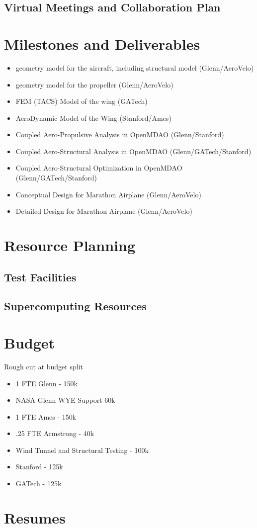 \documentclass[]{aiaa-tc}
\begin{document}
    \subsection{Virtual Meetings and Collaboration Plan}

\section{Milestones and Deliverables}

    \begin{itemize}
        \item geometry model for the aircraft, including structural model (Glenn/AeroVelo)
        \item geometry model for the propeller (Glenn/AeroVelo)
        \item FEM (TACS) Model of the wing (GATech)
        \item AeroDynamic Model of the Wing (Stanford/Ames)
        \item Coupled Aero-Propulsive Analysis in OpenMDAO (Glenn/Stanford)
        \item Coupled Aero-Structural Analysis in OpenMDAO (Glenn/GATech/Stanford)
        \item Coupled Aero-Structural Optimization in OpenMDAO (Glenn/GATech/Stanford)
        \item Conceptual Design for Marathon Airplane (Glenn/AeroVelo)
        \item Detailed Design for Marathon Airplane (Glenn/AeroVelo)
    \end{itemize}

  \section{Resource Planning}
    \subsection{Test Facilities}
    \subsection{Supercomputing Resources}

  \appendix

  \section{Budget}
    Rough cut at budget split
    \begin{itemize}
        \item 1 FTE Glenn - 150k 
        \item NASA Glenn WYE Support 60k 
        \item 1 FTE Ames - 150k 
        \item .25 FTE Armstrong - 40k
        \item Wind Tunnel and Structural Testing - 100k 
        \item Stanford - 125k 
        \item GATech - 125k
    \end{itemize}

  \section{Resumes}


  
\end{document}
